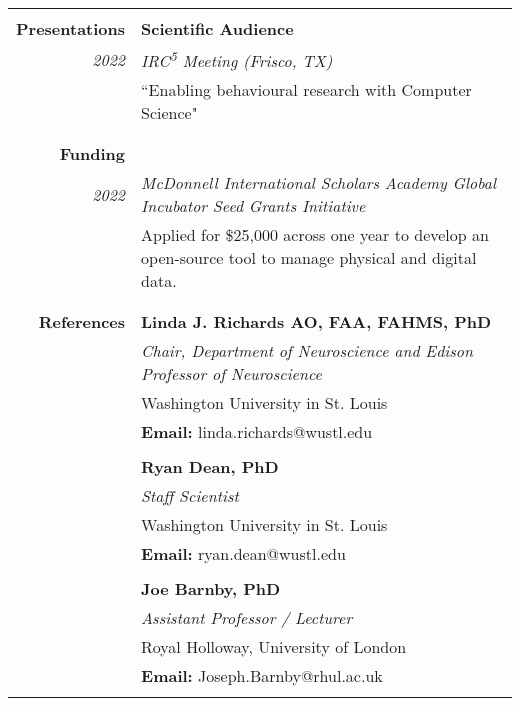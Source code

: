 \documentclass{article}
\begin{document}
\begin{longtable}{>{\columncolor{LeftColumn}}r | p{13cm}}
											\hline \\
											
		\large\textbf{Presentations}		& \large\textbf{Scientific Audience} \\
		\large\textit{2022}					& \large\textit{IRC\textsuperscript{5} Meeting (Frisco, TX)} \\
											& ``Enabling behavioural research with Computer Science" \\	
											& \\

											\hline \\
											
		\large\textbf{Funding}				& \\
		\large\textit{2022}					& \large\textit{McDonnell International Scholars Academy Global Incubator Seed Grants Initiative} \\
											& Applied for \$25,000 across one year to develop an open-source tool to manage physical and digital data. \\
											& \\

											\hline

											\pagebreak

											\hline \\
		\large\textbf{References} 	  		& \large\textbf{Linda J. Richards AO, FAA, FAHMS, PhD} \\
											& \textit{Chair, Department of Neuroscience and Edison Professor of Neuroscience} \\
											& Washington University in St. Louis \\
											& \textbf{Email:} linda.richards@wustl.edu \\
											& \\

											& \large\textbf{Ryan Dean, PhD} \\
											& \textit{Staff Scientist} \\
											& Washington University in St. Louis \\
											& \textbf{Email:} ryan.dean@wustl.edu \\
											& \\

											& \large\textbf{Joe Barnby, PhD} \\
											& \textit{Assistant Professor / Lecturer} \\
											& Royal Holloway, University of London \\
											& \textbf{Email:} Joseph.Barnby@rhul.ac.uk \\
											& \\
											\hline
	\end{longtable}
\end{document}
